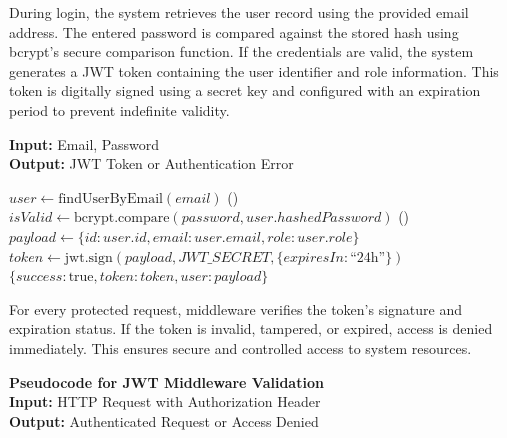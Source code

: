 During login, the system retrieves the user record using the provided email address. The entered password is compared against the stored hash using bcrypt's secure comparison function. If the credentials are valid, the system generates a JWT token containing the user identifier and role information. This token is digitally signed using a secret key and configured with an expiration period to prevent indefinite validity.

\begin{algorithm}[H]
\caption{JWT Authentication Process}
\label{alg:jwt_authentication}
\textbf{Input:} Email, Password\\
\textbf{Output:} JWT Token or Authentication Error
\begin{algorithmic}[1]
    \State $user \gets \text{findUserByEmail}(email)$
        \State \Return {}()
    \EndIf
    \State $isValid \gets \text{bcrypt.compare}(password, user.hashedPassword)$
        \State \Return {}()
    \EndIf
    \State $payload \gets \{id: user.id, email: user.email, role: user.role\}$
    \State $token \gets \text{jwt.sign}(payload, JWT\_SECRET, \{expiresIn: \text{``24h''}\})$
    \State \Return $\{success: \text{true}, token: token, user: payload\}$
\EndFunction
\end{algorithmic}
\end{algorithm}

For every protected request, middleware verifies the token's signature and expiration status. If the token is invalid, tampered, or expired, access is denied immediately. This ensures secure and controlled access to system resources.

\noindent\textbf{Pseudocode for JWT Middleware Validation} 
\vspace{.2em} \\
\noindent\textbf{Input:} HTTP Request with Authorization Header\\
\noindent\textbf{Output:} Authenticated Request or Access Denied

